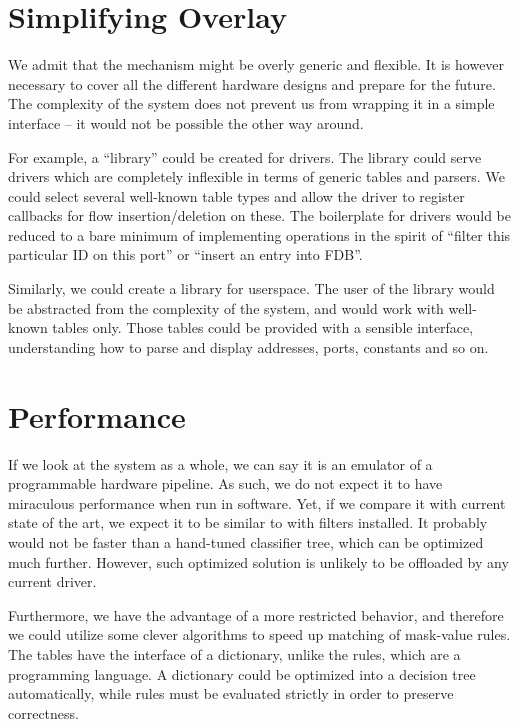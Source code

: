 \section{Simplifying Overlay}

We admit that the mechanism might be overly generic and flexible. It is however
necessary to cover all the different hardware designs and prepare for the
future. The complexity of the system does not prevent us from wrapping it in
a simple interface -- it would not be possible the other way around.

For example, a ``library'' could be created for drivers. The library could
serve drivers which are completely inflexible in terms of generic tables and
parsers. We could select several well-known table types and allow the driver to
register callbacks for flow insertion/deletion on these. The boilerplate for
drivers would be reduced to a bare minimum of implementing operations in the spirit
of ``filter this particular  ID on this port'' or ``insert an entry
into FDB''.

Similarly, we could create a library for userspace. The user of the library
would be abstracted from the complexity of the system, and would work with
well-known tables only. Those tables could be provided with a sensible
interface, understanding how to parse and display addresses, ports, constants
and so on.

\section{Performance}

If we look at the system as a whole, we can say it is an emulator of
a programmable hardware pipeline. As such, we do not expect it to have
miraculous performance when run in software. Yet, if we compare it with
current state of the art, we expect it to be similar to  with 
filters installed. It probably would not be faster than a hand-tuned 
classifier tree, which can be optimized much further. However, such optimized
solution is unlikely to be offloaded by any current driver.

Furthermore, we have the advantage of a more restricted behavior, and therefore
we could utilize some clever algorithms to speed up matching of mask-value
rules. The tables have the interface of a dictionary, unlike the  rules, which are
a programming language. A dictionary could be optimized into a decision tree
automatically, while  rules must be evaluated strictly in order to
preserve correctness.

